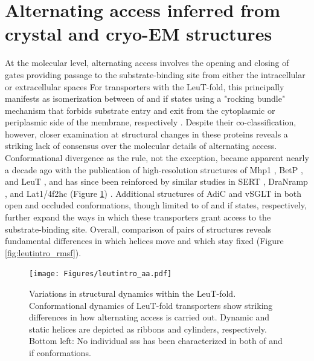 \section{Alternating access inferred from crystal and cryo-EM structures}

At the molecular level, alternating access involves the opening and closing of gates providing passage to the substrate-binding site from either the intracellular or extracellular spaces \citep*{Jardetzky1966} For transporters with the LeuT-fold, this principally manifests as isomerization between \gls{of} and \gls{if} states using a "rocking bundle" mechanism that forbids substrate entry and exit from the cytoplasmic or periplasmic side of the membrane, respectively \citep*{Forrest2009}. Despite their co-classification, however, closer examination at structural changes in these proteins reveals a striking lack of consensus over the molecular details of alternating access. Conformational divergence as the rule, not the exception, became apparent nearly a decade ago with the publication of high-resolution structures of Mhp1 \citep*{Shimamura2010, Weyand2008}, BetP \citep*{Ressl2009}, and LeuT \citep*{Kazmier2017, Krishnamurthy2012, Yamashita2005}, and has since been reinforced by similar studies in SERT \citep*{Coleman2016, Coleman2019}, DraNramp \citep*{Bozzi2016, Bozzi2019}, and Lat1/4f2hc (Figure \ref{fig:leutintro_aa}) \citep*{Yan2021, Lee2019, Yan2021}. Additional structures of AdiC \citep*{Fang2009, Gao2009} and vSGLT \citep*{Faham2008, Watanabe2010} in both open and occluded conformations, though limited to \gls{of} and \gls{if} states, respectively, further expand the ways in which these transporters grant access to the substrate-binding site. Overall, comparison of pairs of structures reveals fundamental differences in which helices move and which stay fixed (Figure \ref{fig:leutintro_rmsf}).

\begin{figure}[h!]
\centering
\texttt{[image: Figures/leutintro\_aa.pdf]}
 \caption[Variations in structural dynamics within the LeuT-fold.]{Variations in structural dynamics within the LeuT-fold. Conformational dynamics of LeuT-fold transporters show striking differences in how alternating access is carried out. Dynamic and static helices are depicted as ribbons and cylinders, respectively. Bottom left: No individual \gls{sss} has been characterized in both \gls{of} and \gls{if} conformations.}
\label{fig:leutintro_aa}
\end{figure}

